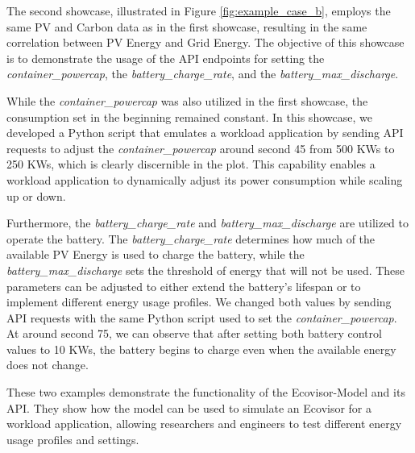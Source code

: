 The second showcase, illustrated in Figure \ref{fig:example_case_b}, employs the same PV and Carbon data as in the first showcase, resulting in the same correlation between PV Energy and Grid Energy. The objective of this showcase is to demonstrate the usage of the API endpoints for setting the \textit{container\_powercap}, the \textit{battery\_charge\_rate}, and the \textit{battery\_max\_discharge}.

While the \textit{container\_powercap} was also utilized in the first showcase, the consumption set in the beginning remained constant. In this showcase, we developed a Python script that emulates a workload application by sending API requests to adjust the \textit{container\_powercap} around second 45 from 500 KWs to 250 KWs, which is clearly discernible in the plot. This capability enables a workload application to dynamically adjust its power consumption while scaling up or down.

Furthermore, the \textit{battery\_charge\_rate} and \textit{battery\_max\_discharge} are utilized to operate the battery. The \textit{battery\_charge\_rate} determines how much of the available PV Energy is used to charge the battery, while the \textit{battery\_max\_discharge} sets the threshold of energy that will not be used. These parameters can be adjusted to either extend the battery's lifespan or to implement different energy usage profiles. We changed both values by sending API requests with the same Python script used to set the \textit{container\_powercap}. At around second 75, we can observe that after setting both battery control values to 10 KWs, the battery begins to charge even when the available energy does not change.

These two examples demonstrate the functionality of the Ecovisor-Model and its API. They show how the model can be used to simulate an Ecovisor for a workload application, allowing researchers and engineers to test different energy usage profiles and settings.
